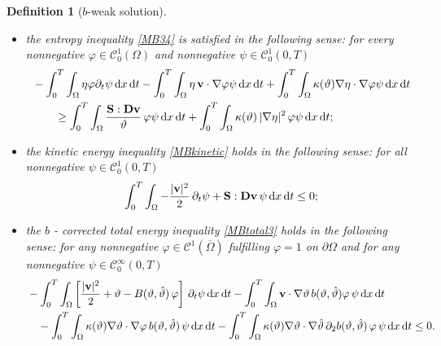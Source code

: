 \documentclass[11pt, a4paper, reqno]{amsart}
\newtheorem{definition}[theorem]{Definition}
\numberwithin{equation}{section}
\newcommand{\dert}{\partial_t}
\newcommand{\thetah}{\hat\thet}
\newcommand{\vc}[1]{{\bf #1}}
\newcommand{\vv}{\vc{v}}
\newcommand{\thet}{\vartheta}
\renewcommand{\S}{\mathbf{S}}
\newcommand{\D}{\mathbf{D}}
\newcommand{\dt}{\,{\rm d} t }
\newcommand{\dx}{\,{\rm d} {x}}
\newcommand{\dxdt}{\dx  \dt}
\newcommand{\intnO}[1]{\int_0^{\infty}\intO{ #1 }\dt}
\newcommand{\intO}[1]{\int_{\Omega} #1 \dx}
\newcommand{\intTO}[1]{\int_0^T \int_{\Omega} #1  \dxdt}
\newcommand{\bb}{b}
\newcommand{\B}{B}
\newcommand{\bws}{$\bb$-weak solution}
\begin{document}
\begin{definition}[\bws]
\begin{itemize}[leftmargin=*]
\begin{equation}
\end{equation}
\item  the entropy inequality \eqref{MB34} is satisfied in the following sense: for every nonnegative $\varphi \in \mathcal{C}^1_0(\Omega)$ and nonnegative $\psi \in \mathcal{C}_0^1 (0,T)$
\begin{equation}\label{entropy-limit}
\begin{split}
&-\intTO{\eta \varphi \dert\psi}  - \intTO{\eta\,\vv\cdot \nabla\varphi \psi}  + \intTO{\kappa(\thet)\nabla\eta\cdot\nabla\varphi \psi} \\
&\qquad \geq \intTO{\frac{\S:\D{\vv}}{\thet}\,\varphi \psi} + \intTO{\kappa(\thet)\,|\nabla \eta|^2\, \varphi \psi}; %
\end{split}
\end{equation}

\item the kinetic energy inequality \eqref{MBkinetic} holds in the following sense:  for all nonnegative $\psi\in \mathcal{C}_0^1(0,T)$ 
  \begin{equation}\label{eq:kinen1}
\intTO{-\frac{|\vv|^2}{2}\, \dert\psi + \S:\D\vv \, \psi }\leq 0;
  \end{equation}
\item the $b$ - corrected total energy inequality \eqref{MBtotal3}  holds in the following sense: for any nonnegative $\varphi\in \mathcal{C}^1(\overline{\Omega})$ fulfilling  $\varphi=1$ on $\partial \Omega$ and for any nonnegative  $\psi\in \mathcal{C}^\infty_0(0, T)$    
\begin{equation}\label{TE}
\begin{aligned}
  &- \intTO{\left[\frac{|\vv|^2}{2} + \thet - \B(\thet, \thetah)\,\varphi\right] \,\partial_t \psi}
  -\intTO{\vv\cdot\nabla \thet\, \bb(\thet, \thetah)\varphi\,\psi}\\
 &\quad - \intTO{\kappa(\thet)\nabla\thet\cdot \nabla \varphi\, \bb(\thet, \thetah)\,\psi}
  -\intTO{\kappa(\thet)\nabla\thet\cdot\nabla\thetah \,\partial_{2} \bb(\thet, \thetah)\,\varphi \,\psi}
  \leq 0.
\end{aligned}
\end{equation}
\end{itemize}
\end{definition}
\end{document}
